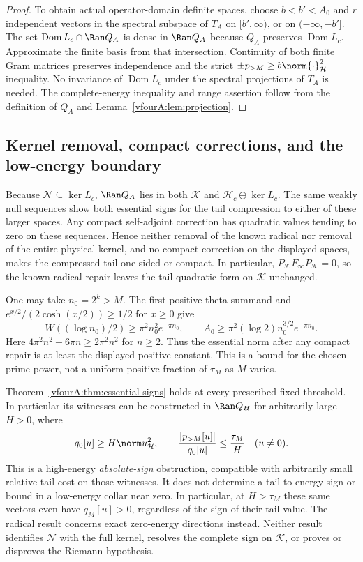 \documentclass[11pt,a4paper]{article}
\numberwithin{equation}{section}
\theoremstyle{definition}\newtheorem{definition}[theorem]{Definition}
\theoremstyle{remark}\newtheorem{remark}[theorem]{Remark}
\newcommand{\Hh}{\mathcal H}\newcommand{\Hw}{\mathcal H}
\newcommand{\dom}{\operatorname{Dom}}\newcommand{\Var}{\operatorname{Var}}
\newcommand{\Nn}{\mathcal N}\newcommand{\Ii}{\mathcal I}\newcommand{\Zz}{\mathcal Z}
\newcommand{\Kk}{\mathcal K}\newcommand{\Aa}{\mathcal A}\newcommand{\Ff}{\mathcal F}
\begin{document}
\begin{proof}
To obtain actual operator-domain definite spaces, choose
$b<b'<A_0$ and $r$ independent vectors in the spectral subspace of
$T_A$ on $[b',\infty)$, or on $(-\infty,-b']$.
The set $\dom L_c\cap\Ran Q_A$ is dense in $\Ran Q_A$ because
$Q_A$ preserves $\dom L_c$.  Approximate the finite basis from
that intersection.  Continuity of both finite Gram matrices
preserves independence and the strict $\pm p_{>M}\ge
b\norm{\cdot}_{\Hh}^2$ inequality.  No invariance of $\dom L_c$
under the spectral projections of $T_A$ is needed.
The complete-energy inequality and range assertion follow from
the definition of $Q_A$ and Lemma~\ref{vfourA:lem:projection}.
\end{proof}

\subsection{Kernel removal, compact corrections, and the low-energy boundary}
\label{vfourA:subsec:scope}

Because $\Nn\subseteq\ker L_c$, $\Ran Q_A$ lies in both $\Kk$ and
$\Hh_c\ominus\ker L_c$.  The same weakly null sequences show both
essential signs for the tail compression to either of these larger
spaces.  Any compact self-adjoint correction has quadratic values
tending to zero on these sequences.  Hence neither removal of the
known radical nor removal of the entire physical kernel, and no
compact correction on the displayed spaces, makes the compressed
tail one-sided or compact.  In particular,
$P_\Kk F_\infty P_\Kk=0$, so the known-radical repair leaves the
tail quadratic form on $\Kk$ unchanged.

One may take $n_0=2^k>M$.  The first positive theta summand and
$e^{x/2}/(2\cosh(x/2))\ge1/2$ for $x\ge0$ give
\[
 W((\log n_0)/2)\ge\pi^2n_0^2e^{-\pi n_0},\qquad
 A_0\ge\pi^2(\log2)n_0^{3/2}e^{-\pi n_0}.
\]
Here $4\pi^2n^2-6\pi n\ge2\pi^2n^2$ for $n\ge2$.
Thus the essential norm after any compact repair is at least the
displayed positive constant.  This is a bound for the chosen prime
power, not a uniform positive fraction of $\tau_M$ as $M$ varies.

Theorem~\ref{vfourA:thm:essential-signs} holds at every prescribed
fixed threshold.  In particular its witnesses can be constructed
in $\Ran Q_H$ for arbitrarily large $H>0$, where
\[
 q_0[u]\ge H\norm u_{\Hh}^2,\qquad
 \frac{|p_{>M}[u]|}{q_0[u]}\le\frac{\tau_M}{H}
 \quad(u\ne0).
\]
This is a high-energy \emph{absolute-sign} obstruction, compatible
with arbitrarily small relative tail cost on those witnesses.  It
does not determine a tail-to-energy sign or bound in a low-energy
collar near zero.  In particular, at $H>\tau_M$ these same vectors
even have $q_M[u]>0$, regardless of the sign of their tail value.
The radical result concerns exact zero-energy directions instead.
Neither result identifies $\Nn$ with the full kernel, resolves the
complete sign on $\Kk$, or proves or disproves the Riemann hypothesis.
\end{document}
